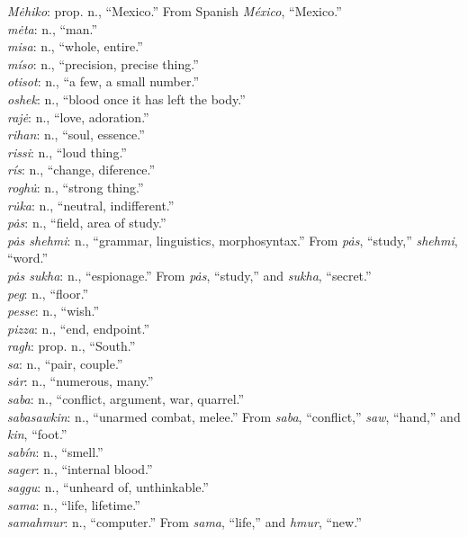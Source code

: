 \documentclass{article}[10pt]
\begin{document}
\begin{multicols}{3}
\emph{M\.{e}hiko}: prop. n., ``Mexico.'' From Spanish \emph{M\'{e}xico}, ``Mexico.''\\
\emph{m\.{e}ta}: n., ``man.''\\
\emph{misa}: n., ``whole, entire.''\\
\emph{m\'{i}so}: n., ``precision, precise thing.''\\
\emph{otisot}: n., ``a few, a small number.''\\
\emph{oshek}: n., ``blood once it has left the body.''\\
\emph{raj\.{e}}: n., ``love, adoration.''\\
\emph{rihan}: n., ``soul, essence.''\\
\emph{rissi}: n., ``loud thing.''\\
\emph{r\'{i}s}: n., ``change, diference.''\\
\emph{rogh\.{u}}: n., ``strong thing.''\\
\emph{r\.{u}ka}: n., ``neutral, indifferent.''\\
\emph{p\.{a}s}: n., ``field, area of study.''\\
\emph{p\.{a}s shehmi}: n., ``grammar, linguistics, morphosyntax.'' From \emph{p\.{a}s}, ``study,'' \emph{shehmi}, ``word.''\\
\emph{p\.{a}s sukha}: n., ``espionage.'' From \emph{p\.{a}s}, ``study,'' and \emph{sukha}, ``secret.''\\
\emph{peg}: n., ``floor.''\\
\emph{pesse}: n., ``wish.''\\
\emph{pizza}: n., ``end, endpoint.''\\
\emph{ragh}: prop. n., ``South.''\\
\emph{sa}: n., ``pair, couple.''\\
\emph{s\.{a}r}: n., ``numerous, many.''\\
\emph{saba}: n., ``conflict, argument, war, quarrel.''\\
\emph{sabasawkin}: n., ``unarmed combat, melee.'' From \emph{saba}, ``conflict,'' \emph{saw}, ``hand,'' and \emph{kin}, ``foot.''\\
\emph{sab\'{i}n}: n., ``smell.''\\
\emph{sager}: n., ``internal blood.''\\
\emph{saggu}: n., ``unheard of, unthinkable.''\\
\emph{sama}: n., ``life, lifetime.''\\
\emph{samahmur}: n., ``computer.'' From \emph{sama}, ``life,'' and \emph{hmur}, ``new.''\\

\end{multicols}
\end{document}
